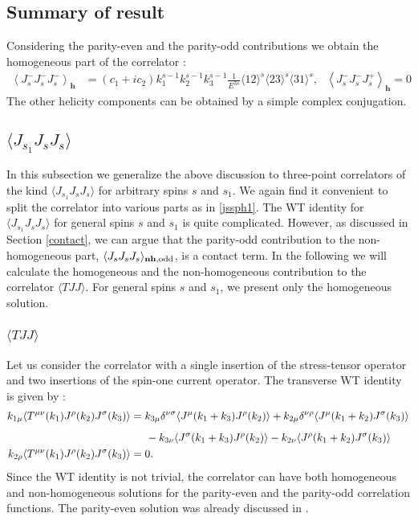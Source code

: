 \documentclass[a4paper,11pt]{article}
\begin{document}
\subsection*{Summary of result}
Considering the parity-even and the parity-odd contributions we obtain the homogeneous part of the correlator :
\begin{align}\label{jsjsjsHH}
\left\langle J_s^- J_s^- J_s^- \right\rangle_{\textbf{h}} &=(c_1+ i c_2)k^{s-1}_1 k^{s-1}_2 k^{s-1}_3\frac{1}{E^{3s}}\langle 12 \rangle^s \langle 23 \rangle^s \langle 31 \rangle^s,~~~
\left\langle  J_s^- J_s^- J_s^+\right\rangle_{\textbf{h}} =0
\end{align}
The other helicity components can be obtained by a simple complex conjugation.
\subsection{$\langle J_{s_1}J_s J_s \rangle$}
In this subsection we generalize the above discussion to three-point correlators of the kind $\langle J_{s_1} J_s J_s \rangle$ for arbitrary spins $s$ and $s_1$. We again find it convenient to split the correlator into various parts as in \eqref{jssph1}.
The WT identity for $ \langle J_{s_1} J_s J_s \rangle$ for general spins $s$ and $s_1$ is quite complicated. However, as discussed in Section \ref{contact}, we can argue that the parity-odd contribution to the non-homogeneous part, $\langle J_s J_s J_s \rangle_{\bf{nh},\text{odd}}$, is a contact term. In the following we will calculate the homogeneous and the non-homogeneous contribution to the correlator $\langle TJJ \rangle$. For general spins $s$ and $s_1$, we present only the homogeneous solution.
 
\subsubsection{$\langle TJJ \rangle$}
Let us consider the correlator with a single insertion of the stress-tensor operator and two insertions of the spin-one current operator. The transverse WT identity is given by : \cite{Bzowski:2013sza,Bzowski:2017poo}
\begin{align}\label{tjjoddwi}
\begin{split}
k_{1\mu}\langle T^{\mu\nu}(k_1)J^{\rho}(k_2)J^{\sigma}(k_3) \rangle &= k_{3\mu}\delta^{\nu\sigma} \langle J^{\mu}(k_1+k_3)J^{\rho}(k_2) \rangle+k_{2\mu}\delta^{\nu\rho}\langle J^{\mu}(k_1+k_2)J^{\sigma}(k_3) \rangle\\[5 pt]
&\hspace{.5cm}-k_{3\nu}\langle J^{\sigma}(k_1+k_3)J^{\rho}(k_2) \rangle-k_{2\nu}\langle J^{\rho}(k_1+k_2) J^{\sigma}(k_3) \rangle\\
k_{2\rho}\langle T^{\mu\nu}(k_1)J^{\rho}(k_2)J^{\sigma}(k_3) \rangle &=0.
\end{split}
\end{align}
Since the WT identity is not trivial, the correlator can have both homogeneous and non-homogeneous solutions for the parity-even and the parity-odd correlation functions. The parity-even solution was already discussed in \cite{Bzowski:2013sza,Bzowski:2017poo}. 
\end{document}
